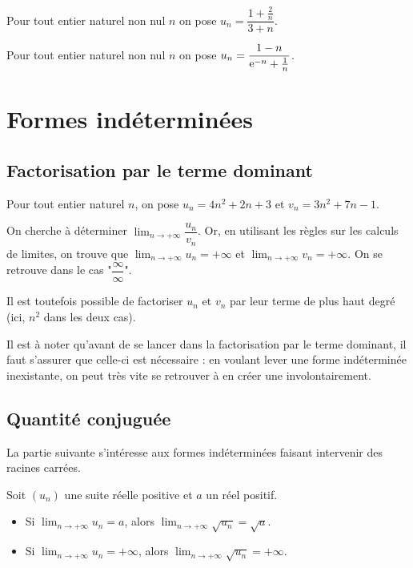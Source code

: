 \documentclass[11pt,fleqn]{book} %
\begin{document}
\begin{example} Pour tout entier naturel non nul $n$ on pose $u_n=\dfrac{1+\frac{2}{n}}{3+n}$.

\vskip40pt \end{example}


\begin{example} Pour tout entier naturel non nul $n$ on pose $u_n=\dfrac{1-n}{\mathrm{e}^{-n}+\frac{1}{n}}$.

\vskip40pt
\end{example}




\section{Formes indéterminées}

\subsection{Factorisation par le terme dominant}

\begin{example} Pour tout entier naturel $n$, on pose $u_n=4n^2+2n+3$ et $v_n = 3n^2+7n-1$. 

On cherche à déterminer $\displaystyle \lim_{n \to +\infty} \dfrac{u_n}{v_n}$. Or, en utilisant les règles sur les calculs de limites, on trouve que $\displaystyle \lim_{n \to +\infty} u_n = +\infty$ et $\displaystyle \lim_{n \to +\infty} v_n = +\infty$. On se retrouve dans le cas "$\dfrac{\infty}{\infty}$".

Il est toutefois possible de factoriser $u_n$ et $v_n$ par leur terme de plus haut degré (ici, $n^2$ dans les deux cas). 

\vskip150pt

\end{example}

Il est à noter qu'avant de se lancer dans la factorisation par le terme dominant, il faut s'assurer que celle-ci est nécessaire : en voulant lever une forme indéterminée inexistante, on peut très vite se retrouver à en créer une involontairement.

\subsection{Quantité conjuguée}

La partie suivante s'intéresse aux formes indéterminées faisant intervenir des racines carrées.

\begin{proposition}Soit $(u_n)$ une suite réelle positive et $a$ un réel positif.
\begin{itemize}
\item Si $\displaystyle \lim_{n \to +\infty} u_n=a$, alors $\displaystyle \lim_{n \to +\infty} \sqrt{u_n}=\sqrt{a}$.
\item Si $\displaystyle \lim_{n \to +\infty} u_n=+\infty$, alors $\displaystyle \lim_{n \to +\infty} \sqrt{u_n}=+\infty$.
\end{itemize}\end{proposition}
\end{document}
